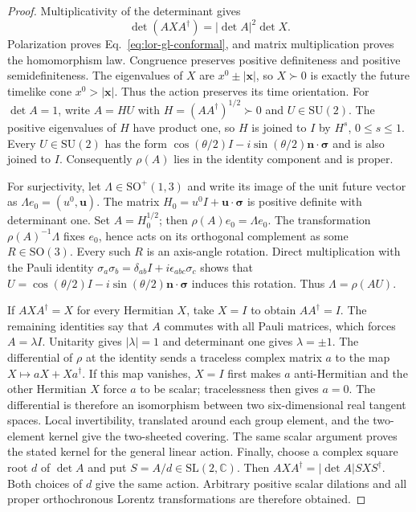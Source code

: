 \begin{proof}
Multiplicativity of the determinant gives
\[
\det(AXA^\dagger)=|\det A|^2\det X.
\]
Polarization proves Eq.~\eqref{eq:lor-gl-conformal}, and matrix multiplication proves the homomorphism law. Congruence preserves positive definiteness and positive semidefiniteness. The eigenvalues of $X$ are $x^0\pm|\boldsymbol x|$, so $X\succ0$ is exactly the future timelike cone $x^0>|\boldsymbol x|$. Thus the action preserves its time orientation. For $\det A=1$, write $A=HU$ with $H=(AA^\dagger)^{1/2}\succ0$ and $U\in\mathrm{SU}(2)$. The positive eigenvalues of $H$ have product one, so $H$ is joined to $I$ by $H^s$, $0\leq s\leq1$. Every $U\in\mathrm{SU}(2)$ has the form $\cos(\theta/2)I-i\sin(\theta/2)\boldsymbol n\cdot\boldsymbol\sigma$ and is also joined to $I$. Consequently $\rho(A)$ lies in the identity component and is proper.

For surjectivity, let $\Lambda\in\mathrm{SO}^{+}(1,3)$ and write its image of the unit future vector as $\Lambda e_0=(u^0,\boldsymbol u)$. The matrix $H_0=u^0I+\boldsymbol u\cdot\boldsymbol\sigma$ is positive definite with determinant one. Set $A=H_0^{1/2}$; then $\rho(A)e_0=\Lambda e_0$. The transformation $\rho(A)^{-1}\Lambda$ fixes $e_0$, hence acts on its orthogonal complement as some $R\in\mathrm{SO}(3)$. Every such $R$ is an axis-angle rotation. Direct multiplication with the Pauli identity $\sigma_a\sigma_b=\delta_{ab}I+i\epsilon_{abc}\sigma_c$ shows that $U=\cos(\theta/2)I-i\sin(\theta/2)\boldsymbol n\cdot\boldsymbol\sigma$ induces this rotation. Thus $\Lambda=\rho(AU)$.

If $AXA^\dagger=X$ for every Hermitian $X$, take $X=I$ to obtain $AA^\dagger=I$. The remaining identities say that $A$ commutes with all Pauli matrices, which forces $A=\lambda I$. Unitarity gives $|\lambda|=1$ and determinant one gives $\lambda=\pm1$. The differential of $\rho$ at the identity sends a traceless complex matrix $a$ to the map $X\mapsto aX+Xa^\dagger$. If this map vanishes, $X=I$ first makes $a$ anti-Hermitian and the other Hermitian $X$ force $a$ to be scalar; tracelessness then gives $a=0$. The differential is therefore an isomorphism between two six-dimensional real tangent spaces. Local invertibility, translated around each group element, and the two-element kernel give the two-sheeted covering. The same scalar argument proves the stated kernel for the general linear action. Finally, choose a complex square root $d$ of $\det A$ and put $S=A/d\in\mathrm{SL}(2,\mathbb C)$. Then $AXA^\dagger=|\det A|SXS^\dagger$. Both choices of $d$ give the same action. Arbitrary positive scalar dilations and all proper orthochronous Lorentz transformations are therefore obtained.
\end{proof}

